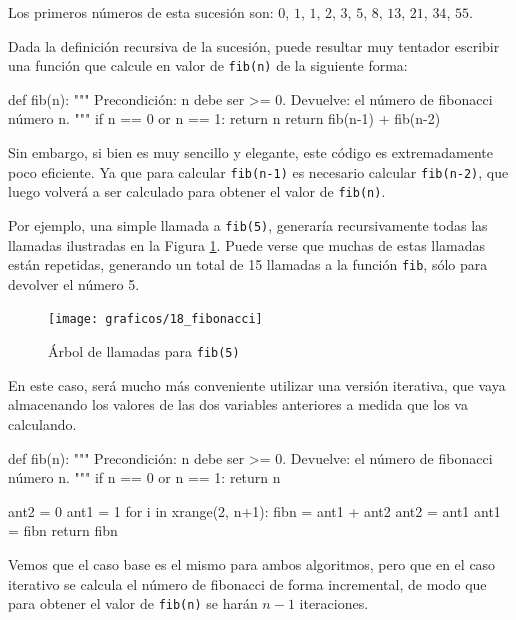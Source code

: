Los primeros números de esta sucesión son: $0$, $1$, $1$, $2$, $3$, $5$, $8$,
$13$, $21$, $34$, $55$.

Dada la definición recursiva de la sucesión, puede resultar muy tentador
escribir una función que calcule en valor de \lstinline!fib(n)! de la siguiente
forma:

\begin{codigo-python-sn}
def fib(n):
    """ Precondición: n debe ser >= 0.
        Devuelve: el número de fibonacci número n. """
    if n == 0 or n == 1:
        return n
    return fib(n-1) + fib(n-2)
\end{codigo-python-sn}

Sin embargo, si bien es muy sencillo y elegante, este código es extremadamente
poco eficiente.  Ya que para calcular \lstinline!fib(n-1)! es necesario calcular
\lstinline!fib(n-2)!, que luego volverá a ser calculado para obtener el valor de
\lstinline!fib(n)!.

Por ejemplo, una simple llamada a \lstinline!fib(5)!, generaría
recursivamente todas las llamadas ilustradas en la Figura \ref{fibonacci}.
Puede verse que muchas de estas llamadas están repetidas, generando un
total de 15 llamadas a la función \lstinline!fib!, sólo para devolver el
número 5.

\begin{figure}[htb]
\texttt{[image: graficos/18\_fibonacci]}
\caption{Árbol de llamadas para \lstinline!fib(5)!}
\label{fibonacci}
\end{figure}

En este caso, será mucho más conveniente utilizar una versión iterativa,
que vaya almacenando los valores de las dos variables anteriores a medida
que los va calculando.

\newpage

\begin{codigo-python-sn}
def fib(n):
    """ Precondición: n debe ser >= 0.
        Devuelve: el número de fibonacci número n. """
    if n == 0 or n == 1:
        return n

    ant2 = 0
    ant1 = 1
    for i in xrange(2, n+1):
        fibn = ant1 + ant2
        ant2 = ant1
        ant1 = fibn
    return fibn
\end{codigo-python-sn}

Vemos que el caso base es el mismo para ambos algoritmos, pero que en el
caso iterativo se calcula el número de fibonacci de forma incremental, de
modo que para obtener el valor de \lstinline!fib(n)! se harán $n-1$
iteraciones.

